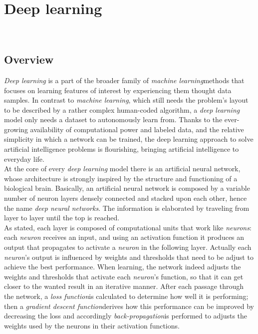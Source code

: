 
\chapter{Deep learning}
\label{cap:deep-learning}

\\

\section{Overview}
	\emph{Deep learning} is a part of the broader family of \emph{\gls{machine learning}}\glsfirstoccur methods that focuses on learning features of interest by experiencing them thought data samples. In contrast to \emph{machine learning}, which still needs the problem's layout to be described by a rather complex human-coded algorithm, a \emph{deep learning} model only needs a dataset to autonomously learn from. Thanks to the ever-growing availability of computational power and labeled data, and the relative simplicity in which a network can be trained, the deep learning approach to solve artificial intelligence problems is flourishing, bringing artificial intelligence to everyday life. \\
	At the core of every \emph{deep learning} model there is an artificial neural network, whose architecture is strongly inspired by the structure and functioning of a biological brain. Basically, an artificial neural network is composed by a variable number of neuron layers densely connected and stacked upon each other, hence the name \emph{deep neural networks}. The information is elaborated by traveling from layer to layer until the top is reached. \\
		As stated, each layer is composed of computational units that work like \emph{neurons}: each \emph{neuron} receives an input, and using an activation function it produces an output that propagates to activate a \emph{neuron} in the following layer. Actually each \emph{neuron}'s output is influenced by weights and thresholds that need to be adjust to achieve the best performance.
	 When learning, the network indeed adjusts the weights and thresholds that activate each \emph{neuron}'s function, so that it can get closer to the wanted result in an iterative manner. After each passage through the network, a \emph{\gls{loss function}}\glsfirstoccur is calculated to determine how well it is performing; then a \emph{\gls{gradient descent function}}\glsfirstoccur derives how this performance can be improved by decreasing the loss and accordingly \emph{\gls{back-propagation}}\glsfirstoccur is performed to adjusts the weights used by the neurons in their activation functions.
	 
